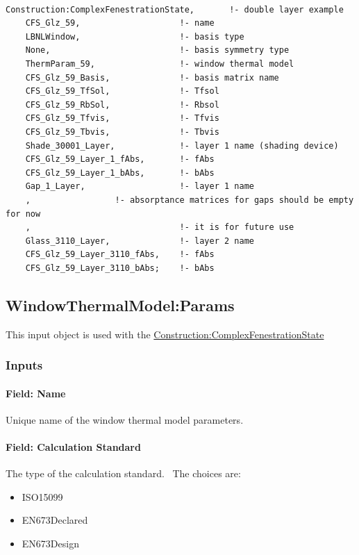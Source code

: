 \begin{lstlisting}

Construction:ComplexFenestrationState,       !- double layer example
    CFS_Glz_59,                    !- name
    LBNLWindow,                    !- basis type
    None,                          !- basis symmetry type
    ThermParam_59,                 !- window thermal model
    CFS_Glz_59_Basis,              !- basis matrix name
    CFS_Glz_59_TfSol,              !- Tfsol
    CFS_Glz_59_RbSol,              !- Rbsol
    CFS_Glz_59_Tfvis,              !- Tfvis
    CFS_Glz_59_Tbvis,              !- Tbvis
    Shade_30001_Layer,             !- layer 1 name (shading device)
    CFS_Glz_59_Layer_1_fAbs,       !- fAbs
    CFS_Glz_59_Layer_1_bAbs,       !- bAbs
    Gap_1_Layer,                   !- layer 1 name
    ,                 !- absorptance matrices for gaps should be empty for now
    ,                              !- it is for future use
    Glass_3110_Layer,              !- layer 2 name
    CFS_Glz_59_Layer_3110_fAbs,    !- fAbs
    CFS_Glz_59_Layer_3110_bAbs;    !- bAbs
\end{lstlisting}

\subsection{WindowThermalModel:Params}\label{windowthermalmodelparams}

This input object is used with the \hyperref[constructioncomplexfenestrationstate]{Construction:ComplexFenestrationState}

\subsubsection{Inputs}\label{inputs-40}

\paragraph{Field: Name}\label{field-name-33-000}

Unique name of the window thermal model parameters.

\paragraph{Field: Calculation Standard}\label{field-calculation-standard}

The type of the calculation standard.~ The choices are:

\begin{itemize}
\item
  ISO15099
\item
  EN673Declared
\item
  EN673Design
\end{itemize}

